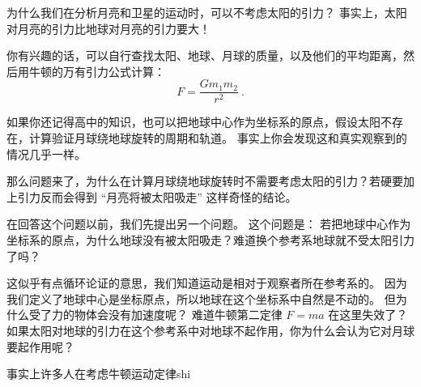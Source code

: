 
为什么我们在分析月亮和卫星的运动时，可以不考虑太阳的引力？ 事实上，太阳对月亮的引力比地球对月亮的引力要大！

你有兴趣的话，可以自行查找太阳、地球、月球的质量，以及他们的平均距离，然后用牛顿的万有引力公式计算：
\begin{equation}
F = \frac{Gm_1m_2}{r^2}~.
\end{equation}

如果你还记得高中的知识，也可以把地球中心作为坐标系的原点，假设太阳不存在，计算验证月球绕地球旋转的周期和轨道。 事实上你会发现这和真实观察到的情况几乎一样。

那么问题来了，为什么在计算月球绕地球旋转时不需要考虑太阳的引力？若硬要加上引力反而会得到 “月亮将被太阳吸走” 这样奇怪的结论。

在回答这个问题以前，我们先提出另一个问题。 这个问题是： 若把地球中心作为坐标系的原点，为什么地球没有被太阳吸走？难道换个参考系地球就不受太阳引力了吗？

这似乎有点循环论证的意思，我们知道运动是相对于观察者所在参考系的。 因为我们定义了地球中心是坐标原点，所以地球在这个坐标系中自然是不动的。 但为什么受了力的物体会没有加速度呢？ 难道牛顿第二定律 $F = ma$ 在这里失效了？ 如果太阳对地球的引力在这个参考系中对地球不起作用，你为什么会认为它对月球要起作用呢？

事实上许多人在考虑牛顿运动定律shi
